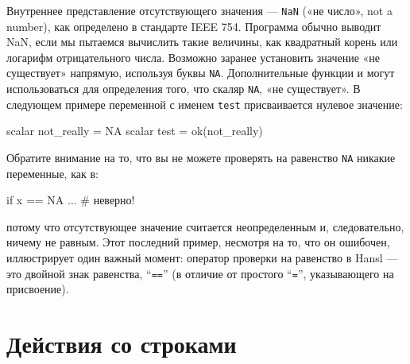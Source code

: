 Внутреннее представление отсутствующего значения --- \texttt{NaN} («не
число», not a number), как определено в стандарте IEEE 754. Программа
обычно выводит NaN, если мы пытаемся вычислить такие величины, как
квадратный корень или логарифм отрицательного числа. Возможно заранее
установить значение «не существует» напрямую, используя буквы
\texttt{NA}. Дополнительные функции  и  могут
использоваться для определения того, что скаляр \texttt{NA}, «не
существует». В следующем примере переменной с именем \texttt{test}
присваивается нулевое значение:
\begin{code}
  scalar not_really = NA
  scalar test = ok(not_really)
\end{code}
Обратите внимание на то, что вы не можете проверять на равенство
\texttt{NA} никакие переменные, как в:
\begin{code}
  if x == NA ... # неверно!
\end{code}
потому что отсутствующее значение считается неопределенным и,
следовательно, ничему не равным. Этот последний пример, несмотря на
то, что он ошибочен, иллюстрирует один важный момент: оператор
проверки на равенство в Hansl --- это двойной знак равенства,
``\texttt{==}'' (в отличие от простого ``\texttt{=}'', указывающего на
присвоение).

\section{Действия со строками}

